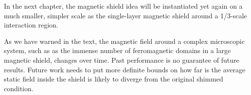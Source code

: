 
In the next chapter, the magnetic shield idea will be instantiated yet again on
a much smaller, simpler scale as the single-layer magnetic shield around a
1/3-scale interaction region.


As we have warned in the text, the magnetic field around a complex microscopic
system, such as as the immense number of ferromagnetic domains in a large
magnetic shield, changes over time. Past performance is no guarantee of future
results. Future work needs to put more definite bounds on how far is the average
static field inside the shield is likely to diverge from the original shimmed
condition.
